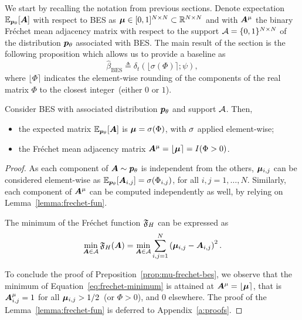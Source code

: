 We start by recalling the notation from previous sections. Denote expectation $\mathbb{E}_{{\bm{p}}_\theta}[{\bm{A}}]$ with respect to BES as $\boldsymbol{\mu}\in [0,1]^{N\times N} \subset {\mathbb{R}}^{N \times N}$ and with ${\bm{A}}^\mu$ the binary Fr\'echet mean adjacency matrix with respect to the support ${\mathcal{A}}=\{0,1\}^{N\times N}$ of the distribution ${{\bm{p}}_\theta}$ associated with BES. The main result of the section is the following proposition which allows us to provide a baseline as
\begin{equation}
    \hat \beta_\text{BES} \triangleq \delta_t\left(\lfloor \sigma(\Phi)\rceil;\psi\right),
\end{equation}
where $\lfloor\Phi\rceil$ indicates the element-wise rounding of the components of the real matrix $\Phi$ to the closest integer~(either $0$ or $1$).

\begin{proposition}\label{prop:mu-frechet-bes}
Consider BES with associated distribution ${{\bm{p}}_\theta}$ and support ${\mathcal{A}}$. Then,
\begin{itemize}
    \item the expected matrix $\mathbb{E}_{{\bm{p}}_\theta}[{\bm{A}}]$ is $\boldsymbol{\mu}=\sigma(\Phi)$, with $\sigma$ applied element-wise;
    \item the Fr\'echet mean adjacency matrix ${\bm{A}}^\mu=\lfloor \boldsymbol{\mu}\rceil = I(\Phi > 0)$. 
\end{itemize}
\end{proposition}

\medskip
\begin{proof}
As each component of ${\bm{A}}\sim {{\bm{p}}_\theta}$ is independent from the others,  $\boldsymbol{\mu}_{i,j}$ can be considered element-wise as $\mathbb{E}_{{\bm{p}}_\theta}[{\bm{A}}_{i,j}]=\sigma(\Phi_{i,j})$, for all $i,j=1,\dots,N$.
Similarly, each component of ${\bm{A}}^\mu$ can be computed independently as well, by relying on Lemma~\ref{lemma:frechet-fun}. 
\begin{lemma}\label{lemma:frechet-fun}
The minimum of the Fr\'echet function $\mathfrak{F}_H$ can be expressed as  
\begin{equation}\label{eq:frechet-minimum}
\min_{{\bm{A}} \in{\mathcal{A}}}\mathfrak{F}_H({\bm{A}}) = \min_{{\bm{A}} \in{\mathcal{A}}}\sum_{i,j=1}^N \left(\boldsymbol{\mu}_{i,j}-{\bm{A}}_{i,j} \right)^2.
\end{equation}
\end{lemma}
To conclude the proof of Preposition~\ref{prop:mu-frechet-bes}, we observe that the minimum of Equation~\eqref{eq:frechet-minimum} is attained at ${\bm{A}}^\mu=\lfloor\boldsymbol{\mu}\rceil$, that is ${\bm{A}}^\mu_{i,j} = 1$ for all $\boldsymbol{\mu}_{i,j}>1/2$~(or $\Phi > 0$), and $0$ elsewhere. The proof of the Lemma~\ref{lemma:frechet-fun} is deferred to Appendix~\ref{a:proofs}.
\end{proof}



